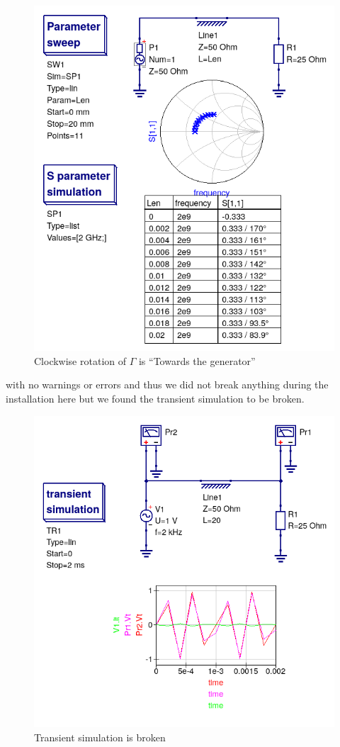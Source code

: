 \documentclass{article}
\begin{document}
\begin{multicols}{2}
\begin{enumerate}[label=(\alph*)]
\begin{figure}[H]
  \includegraphics[width=\linewidth]{tline2.png}\setcounter{enumi}{4}
  \caption{Clockwise rotation of $\Gamma$ is ``Towards the generator''}
  \label{fig4}
\end{figure}
with no warnings or errors and thus we did not break anything during
the installation here but we found the transient simulation to be
broken.
\begin{figure}[H]
  \includegraphics[width=\linewidth]{tline3.png}
  \caption{Transient simulation is broken}
  \label{fig4}
\end{figure}


\end{enumerate}
\end{multicols}
\end{document}
